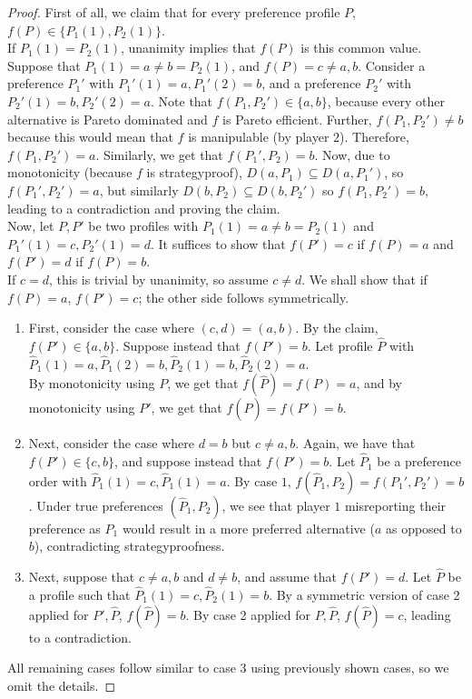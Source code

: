 	\begin{proof}
		First of all, we claim that for every preference profile $P$, $f(P) \in \{P_1(1),P_2(1)\}$.\\
		If $P_1(1) = P_2(1)$, unanimity implies that $f(P)$ is this common value.\\
		Suppose that $P_1(1) = a \ne b = P_2(1)$, and $f(P) = c \ne a,b$. Consider a preference $P_1'$ with $P_1'(1) = a, P_1'(2) = b$, and a preference $P_2'$ with $P_2'(1) = b, P_2'(2) = a$. Note that $f(P_1,P_2') \in \{a,b\}$, because every other alternative is Pareto dominated and $f$ is Pareto efficient. Further, $f(P_1,P_2') \ne b$ because this would mean that $f$ is manipulable (by player $2$). Therefore, $f(P_1,P_2') = a$.  Similarly, we get that $f(P_1',P_2) = b$. Now, due to monotonicity (because $f$ is strategyproof), $D(a,P_1) \subseteq D(a,P_1')$, so $f(P_1',P_2') = a$, but similarly $D(b,P_2) \subseteq D(b,P_2')$ so $f(P_1,P_2') = b$, leading to a contradiction and proving the claim.\\

		Now, let $P,P'$ be two profiles with $P_1(1) = a \ne b = P_2(1)$ and $P_1'(1) = c, P_2'(1) = d$. It suffices to show that $f(P') = c$ if $f(P) = a$ and $f(P') = d$ if $f(P) = b$.\\
		If $c = d$, this is trivial by unanimity, so assume $c \ne d$. We shall show that if $f(P) = a$, $f(P') = c$; the other side follows symmetrically.\\
		
		\begin{enumerate}
			\item First, consider the case where $(c,d) = (a,b)$. By the claim, $f(P') \in \{a,b\}$. Suppose instead that $f(P') = b$. Let profile $\hat{P}$ with $\hat{P}_1(1) = a, \hat{P}_1(2) = b, \hat{P}_2(1) = b, \hat{P}_2(2) = a$.\\
			By monotonicity using $P$, we get that $f(\hat{P}) = f(P) = a$, and by monotonicity using $P'$, we get that $f(\hat{P}) = f(P') = b$.

			\item Next, consider the case where $d = b$ but $c \ne a,b$. Again, we have that $f(P') \in \{c,b\}$, and suppose instead that $f(P') = b$. Let $\hat{P}_1$ be a preference order with $\hat{P}_1(1) = c, \hat{P}_1(1) = a$. By case $1$, $f(\hat{P}_1,P_2) = f(P_1',P_2') = b$. Under true preferences $(\hat{P}_1,P_2)$, we see that player $1$ misreporting their preference as $P_1$ would result in a more preferred alternative ($a$ as opposed to $b$), contradicting strategyproofness.

			\item Next, suppose that $c \ne a,b$ and $d \ne b$, and assume that $f(P') = d$. Let $\hat{P}$ be a profile such that $\hat{P}_1(1) = c, \hat{P}_2(1) = b$. By a symmetric version of case 2 applied for $P',\hat{P}$, $f(\hat{P}) = b$. By case 2 applied for $P,\hat{P}$, $f(\hat{P}) = c$, leading to a contradiction.
		\end{enumerate}
		All remaining cases follow similar to case 3 using previously shown cases, so we omit the details.
	\end{proof}


